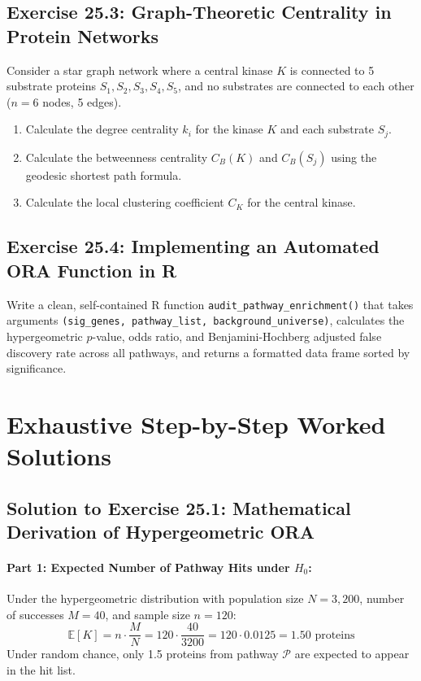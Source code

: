 \documentclass[11pt,twoside,openright]{book}
\begin{document}
\subsection*{Exercise 25.3: Graph-Theoretic Centrality in Protein Networks}
Consider a star graph network where a central kinase $K$ is connected to 5 substrate proteins $S_1, S_2, S_3, S_4, S_5$, and no substrates are connected to each other ($n = 6$ nodes, 5 edges).
\begin{enumerate}
    \item Calculate the degree centrality $k_i$ for the kinase $K$ and each substrate $S_j$.
    \item Calculate the betweenness centrality $C_B(K)$ and $C_B(S_j)$ using the geodesic shortest path formula.
    \item Calculate the local clustering coefficient $C_K$ for the central kinase.
\end{enumerate}

\subsection*{Exercise 25.4: Implementing an Automated ORA Function in R}
Write a clean, self-contained R function \texttt{audit\_pathway\_enrichment()} that takes arguments \texttt{(sig\_genes, pathway\_list, background\_universe)}, calculates the hypergeometric $p$-value, odds ratio, and Benjamini-Hochberg adjusted false discovery rate across all pathways, and returns a formatted data frame sorted by significance.

\section{Exhaustive Step-by-Step Worked Solutions}

\subsection*{Solution to Exercise 25.1: Mathematical Derivation of Hypergeometric ORA}

\paragraph{Part 1: Expected Number of Pathway Hits under $H_0$:}
Under the hypergeometric distribution with population size $N = 3,200$, number of successes $M = 40$, and sample size $n = 120$:
\begin{equation*}
\mathbb{E}[K] = n \cdot \frac{M}{N} = 120 \cdot \frac{40}{3200} = 120 \cdot 0.0125 = 1.50 \text{ proteins}
\end{equation*}
Under random chance, only 1.5 proteins from pathway $\mathcal{P}$ are expected to appear in the hit list.
\end{document}

